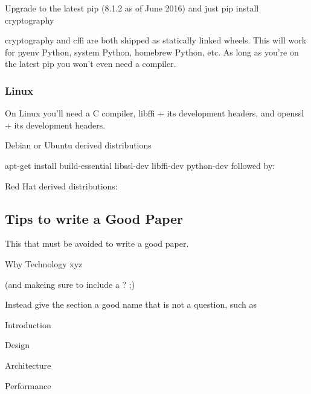 Upgrade to the latest pip (8.1.2 as of June 2016) and just pip install cryptography

cryptography and cffi are both shipped as statically linked wheels. This will work for pyenv Python, system Python, homebrew Python, etc. As long as you're on the latest pip you won't even need a compiler.


\subsubsection{Linux}
\label{\detokenize{faq:linux}}
On Linux you'll need a C compiler, libffi + its development headers, and openssl + its development headers.

Debian or Ubuntu derived distributions

apt-get install build-essential libssl-dev libffi-dev python-dev followed by:

\begin{sphinxVerbatim}[commandchars=\\\{\}]
  
\end{sphinxVerbatim}

Red Hat derived distributions:

\begin{sphinxVerbatim}[commandchars=\\\{\}]
       

  
\end{sphinxVerbatim}


\subsection{Tips to write a Good Paper}
\label{\detokenize{faq:tips-to-write-a-good-paper}}
This that must be avoided to write a good paper.

Why Technology xyz

(and makeing sure to include a ? ;)

Instead give the section a good name that is not a question, such as

Introduction

Design

Architecture

Performance

